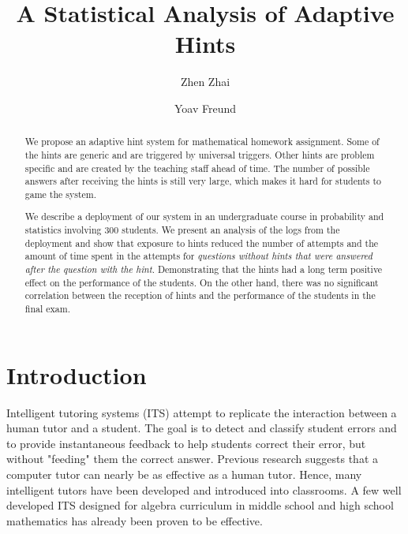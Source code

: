 \documentclass{llncs}
\title{A Statistical Analysis of Adaptive Hints}
\author{Zhen Zhai\inst{1} \and Yoav Freund\inst{2}}
\institute{UC San Diego \email{zzhai@eng.ucsd.edu} \and UC San Diego \email{yfreund@eng.ucsd.edu}}
\begin{document}
\maketitle


\begin{abstract}
We propose an adaptive hint system for mathematical homework assignment. Some of the hints are generic and are triggered by universal triggers. Other hints are problem specific and are created by the teaching staff ahead of time. The number of possible answers after receiving the hints is still very large, which makes it hard for students to game the system.

We describe a deployment of our system in an undergraduate course in probability and statistics involving 300 students. We present an analysis of the logs from the deployment and show that exposure to hints reduced the number of attempts and the amount of time spent in the attempts for {\em questions without hints that were answered after the question with the hint}. Demonstrating that the hints had a long term positive effect on the performance of the students. On the other hand, there was no significant correlation between the reception of hints and the performance of the students in the final exam.

\end{abstract}


\section{Introduction}
Intelligent tutoring systems (ITS)\cite{Anderson1995} attempt to replicate the interaction between a human tutor and a student. The goal is to detect and classify student errors and to provide instantaneous feedback to help students correct their error, but without "feeding" them the correct answer. Previous research suggests that a computer tutor can nearly be as effective as a human tutor\cite{Vanlehn2011}. Hence, many intelligent tutors have been developed and introduced into classrooms. A few well developed ITS designed for algebra curriculum in middle school and high school mathematics has already been proven to be effective\cite{Koedinger1997,John2014}.
\end{document}
